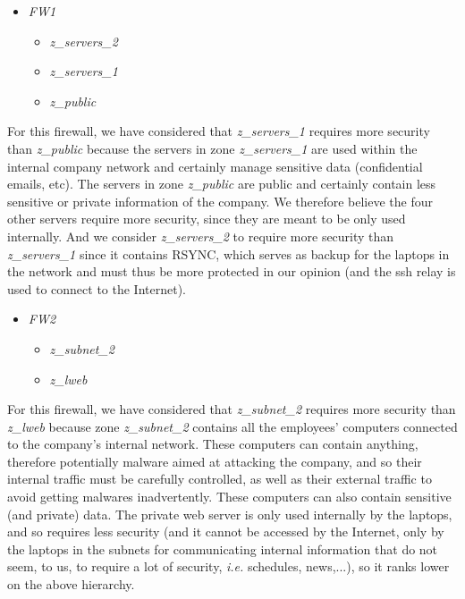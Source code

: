 \documentclass[a4paper, 12pt]{article}
\begin{document}
	\begin{itemize}
	    \item \emph{FW1}
	    \begin{itemize}
	        \item \emph{z\_servers\_2}
	        \item \emph{z\_servers\_1}
	        \item \emph{z\_public}
	    \end{itemize}
    \end{itemize}
    
    For this firewall, we have considered that \emph{z\_servers\_1} requires more security than \emph{z\_public} because the servers in zone \emph{z\_servers\_1} are used within the internal company network and certainly manage sensitive data (confidential emails, etc). The servers in zone \emph{z\_public} are public and certainly contain less sensitive or private information of the company. We therefore believe the four other servers require more security, since they are meant to be only used internally. And we consider \emph{z\_servers\_2} to require more security than \emph{z\_servers\_1} since it contains RSYNC, which serves as backup for the laptops in the network and must thus be more protected in our opinion (and the ssh relay is used to connect to the Internet).
    
    \begin{itemize}
	    \item \emph{FW2}
	    \begin{itemize}
	        \item \emph{z\_subnet\_2}
	        \item \emph{z\_lweb}
	    \end{itemize}
    \end{itemize}
    
    For this firewall, we have considered that \emph{z\_subnet\_2} requires more security than \emph{z\_lweb} because zone \emph{z\_subnet\_2} contains all the employees' computers connected to the company's internal network. These computers can contain anything, therefore potentially malware aimed at attacking the company, and so their internal traffic must be carefully controlled, as well as their external traffic to avoid getting malwares inadvertently. These computers can also contain sensitive (and private) data. The private web server is only used internally by the laptops, and so requires less security (and it cannot be accessed by the Internet, only by the laptops in the subnets for communicating internal information that do not seem, to us, to require a lot of security, \textit{i.e.} schedules, news,...), so it ranks lower on the above hierarchy. 
    
\end{document}
